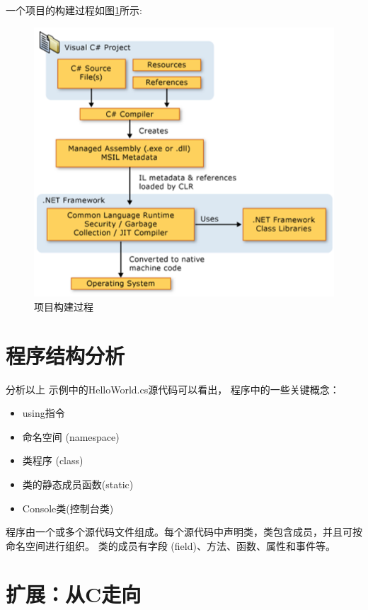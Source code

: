 一个项目的构建过程如图\ref{fig:BuildProject}所示:
\begin{figure}[htbp]
	\centering
	\includegraphics[scale=1.4]{chapter/csenv/BuildProject.png}
	\caption{项目构建过程}
	\label{fig:BuildProject}
\end{figure}



\section{ \cs  程序结构分析}

分析以上 \cs 示例中的HelloWorld.cs源代码可以看出，
  \cs  程序中的一些关键概念：
 \begin{itemize}
	 \item using指令
	 	
	 \item 命名空间 (namespace)
	 \item 类程序 (class)
	 \item 类的静态成员函数(static)
	 \item Console类(控制台类)
 \end{itemize}

  \cs  程序由一个或多个源代码文件组成。每个源代码中声明类，类包含成员，并且可按命名空间进行组织。
 类的成员有字段 (field)、方法、函数、属性和事件等。
 
\section{扩展：从C走向 \cs }

